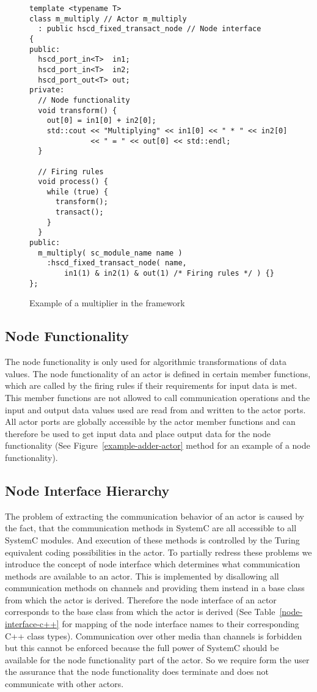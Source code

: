 \begin{figure}
\centering
\begin{verbatim}
template <typename T>
class m_multiply // Actor m_multiply
  : public hscd_fixed_transact_node // Node interface
{
public:
  hscd_port_in<T>  in1;
  hscd_port_in<T>  in2;
  hscd_port_out<T> out;
private:
  // Node functionality
  void transform() {
    out[0] = in1[0] + in2[0];
    std::cout << "Multiplying" << in1[0] << " * " << in2[0]
              << " = " << out[0] << std::endl;
  }
  
  // Firing rules
  void process() {
    while (true) {
      transform();
      transact();
    }
  }
public:
  m_multiply( sc_module_name name )
    :hscd_fixed_transact_node( name,
        in1(1) & in2(1) & out(1) /* Firing rules */ ) {}
};
\end{verbatim}
\caption{\label{example-multiply-actor}Example of a multiplier in the \SysteMoC{} framework}
\end{figure}

\subsection{Node Functionality}
The node functionality is only used for algorithmic transformations of data values.
The node functionality of an actor is defined in certain member functions,
which are called by the firing rules if their requirements for input data is met.
This member functions are not allowed to call communication operations and
the input and output data values used are read from
and written to the actor ports. All actor ports are globally accessible
by the actor member functions and can therefore be used to get input data
and place output data for the node functionality
(See Figure~\ref{example-adder-actor} method  for an example of a node functionality).

\subsection{Node Interface Hierarchy}
The problem of extracting the communication behavior of an actor is caused by the fact,
that the communication methods in SystemC are all accessible to all SystemC modules.
And execution of these methods is controlled by the Turing equivalent coding possibilities
in the actor. To partially redress these problems we introduce the concept of node interface
which determines what communication methods are available to an actor. This is implemented
by disallowing all communication methods on \SysteMoC{} channels and providing them instead
in a base class from which the actor is derived. Therefore the node interface of an actor
corresponds to the base class from which the actor is derived
(See Table~\ref{node-interface-c++} for mapping of the node interface names to their
corresponding C++ class types).
Communication over other media than \SysteMoC{} channels is forbidden but this cannot be enforced
because the full power of SystemC should be available for the node functionality part
of the actor. So we require form the \SysteMoC{} user the assurance that the
node functionality does terminate and does not communicate with other actors.

